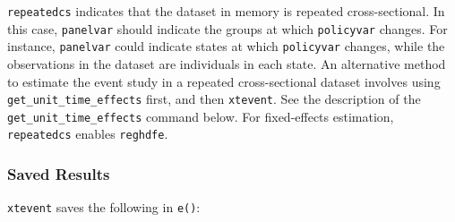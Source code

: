 \documentclass[12pt]{article}
\begin{document}
\hangpara
{\tt repeatedcs} indicates that the dataset in memory is repeated cross-sectional.
In this case, {\tt panelvar} should indicate the groups at which {\tt policyvar} changes.
For instance, {\tt panelvar} could indicate states at which {\tt policyvar} changes, while the observations in the dataset are individuals in each state.
An alternative method to estimate the event study in a repeated cross-sectional dataset involves using {\tt  get\_unit\_time\_effects} first, and then {\tt xtevent}.
See the description of the {\tt get\_unit\_time\_effects} command below.
For fixed-effects estimation, {\tt repeatedcs} enables {\tt reghdfe}.


\subsubsection{Saved Results}
{\tt xtevent} saves the following in {\tt e()}:
\end{document}
